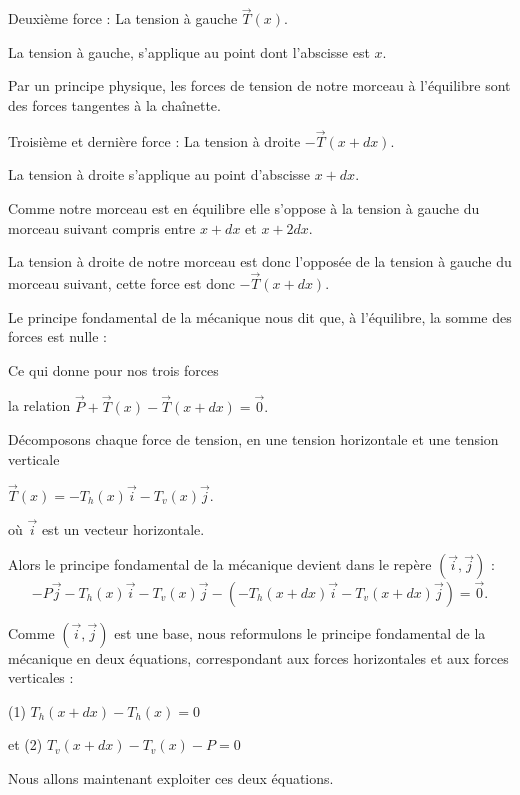 \change
Deuxième force : La tension à gauche $\vec T(x)$.

\change
La tension à gauche, s'applique au point dont l'abscisse est $x$.

\change
 Par un principe physique, les forces de tension de notre morceau à l'équilibre sont
des forces tangentes à la chaînette. 

\change
Troisième et dernière force : La tension à droite $-\vec T(x+dx)$.

\change
La tension à droite s'applique au point d'abscisse $x+dx$.

\change
Comme notre morceau est en équilibre elle s'oppose à la tension à gauche du morceau suivant compris entre $x+dx$ et 
$x + 2dx$. 

\change
La tension à droite de notre morceau est donc l'opposée de la tension à gauche du morceau suivant, 
cette force est donc $-\vec T(x+dx)$.



\diapo



Le principe fondamental de la mécanique nous dit que, 
à l'équilibre, la somme des forces est nulle :

\change
Ce qui donne pour nos trois forces

\change
la relation 
$\vec P + \vec T(x)-\vec T(x+dx) = \vec 0. $




\change
Décomposons chaque force de tension, en une tension horizontale 
et une tension verticale 

\change
$\vec T(x) = -T_h(x)\vec i - T_v(x) \vec j.$

où $\vec i$ est un vecteur horizontale.


\change
Alors le principe fondamental de la mécanique devient dans le repère  $(\vec i,\vec j)$ :
$$-P \vec j - T_h(x)\vec i - T_v(x) \vec j - \left( - T_h(x+dx)\vec i - T_v(x+dx)  \vec j \right)= \vec 0.$$


Comme $(\vec i,\vec j)$ est une base, nous reformulons 
le principe fondamental de la mécanique en deux équations, 
correspondant aux forces horizontales et aux forces verticales :


\change
(1) $T_h(x+dx)-T_h(x) = 0$

\change
et (2) $T_v(x+dx) - T_v(x) - P = 0$

\change
Nous allons maintenant exploiter ces deux équations.


\diapo

